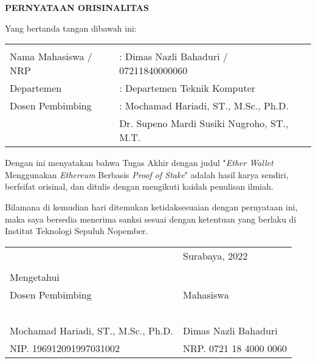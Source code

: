 \begin{center}
  \large
  \textbf{PERNYATAAN ORISINALITAS}
\end{center}

\thispagestyle{empty}

\vspace{2ex}


\noindent Yang bertanda tangan dibawah ini:

\noindent\begin{tabularx}{\textwidth}{X X l}
  & \\
  Nama Mahasiswa / NRP &: Dimas Nazli Bahaduri / 07211840000060 \\
  Departemen &: Departemen Teknik Komputer\\
  Dosen Pembimbing &: Mochamad Hariadi, ST., M.Sc., Ph.D. \\
  & Dr. Supeno Mardi Susiki Nugroho, ST., M.T. \\
\end{tabularx}

Dengan ini menyatakan bahwa Tugas Akhir dengan judul "\emph{Ether Wallet} Menggunakan \emph{Ethereum} Berbasis \emph{Proof of Stake}" adalah hasil karya sendiri, berfsifat orisinal, dan ditulis dengan mengikuti kaidah penulisan ilmiah.

Bilamana di kemudian hari ditemukan ketidaksesuaian dengan pernyataan ini, maka saya bersedia menerima sanksi sesuai dengan ketentuan yang berlaku di Institut Teknologi Sepuluh Nopember.

\vspace{8ex}

\noindent\begin{tabularx}{\textwidth}{X l}
  & Surabaya,  2022\\
  & \\
  Mengetahui & \\
  Dosen Pembimbing & Mahasiswa\\
  & \\
  & \\
  & \\
  & \\
  & \\
  Mochamad Hariadi, ST., M.Sc., Ph.D. & Dimas Nazli Bahaduri \\
  NIP. 196912091997031002 & NRP. 0721 18 4000 0060\\
\end{tabularx}